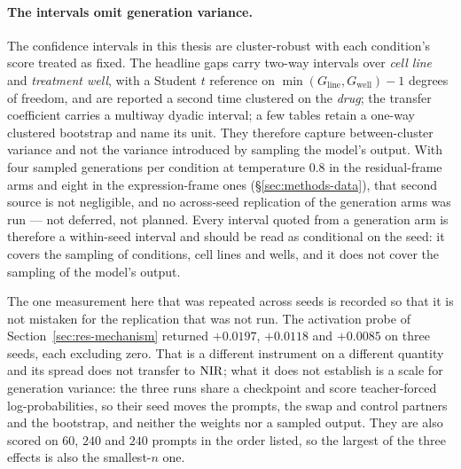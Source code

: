 \paragraph{The intervals omit generation variance.} The confidence intervals in this thesis are
cluster-robust with each condition's score treated as fixed. The headline gaps carry two-way
intervals over \emph{cell line} and \emph{treatment well}, with a Student $t$ reference on
$\min(G_{\textrm{line}}, G_{\textrm{well}}) - 1$ degrees of freedom, and are reported a second time
clustered on the \emph{drug}; the transfer coefficient carries a multiway dyadic interval; a few
tables retain a one-way clustered bootstrap and name its unit. They therefore capture
between-cluster variance and not the variance introduced by sampling the model's output. With four
sampled generations per condition at temperature $0.8$ in the residual-frame arms and eight in the
expression-frame ones (\S\ref{sec:methods-data}), that second source is not negligible, and no
across-seed replication of the generation arms was run --- not deferred, not planned. Every interval quoted
from a generation arm is therefore a within-seed interval and should be read as conditional on the
seed: it covers the sampling of conditions, cell lines and wells, and it does not cover the
sampling of the model's output.

The one measurement here that was repeated across seeds is recorded so that it is not mistaken for
the replication that was not run. The activation probe of Section~\ref{sec:res-mechanism} returned
$+0.0197$, $+0.0118$ and $+0.0085$ on three seeds, each excluding zero. That is a different
instrument on a different quantity and its spread does not transfer to $\textrm{NIR}$; what it does not
establish is a scale for generation variance: the three runs share a checkpoint and score
teacher-forced log-probabilities, so their seed moves the prompts, the swap and control partners and
the bootstrap, and neither the weights nor a sampled output. They are also scored on $60$, $240$ and
$240$ prompts in the order listed, so the largest of the three effects is also the smallest-$n$ one.

